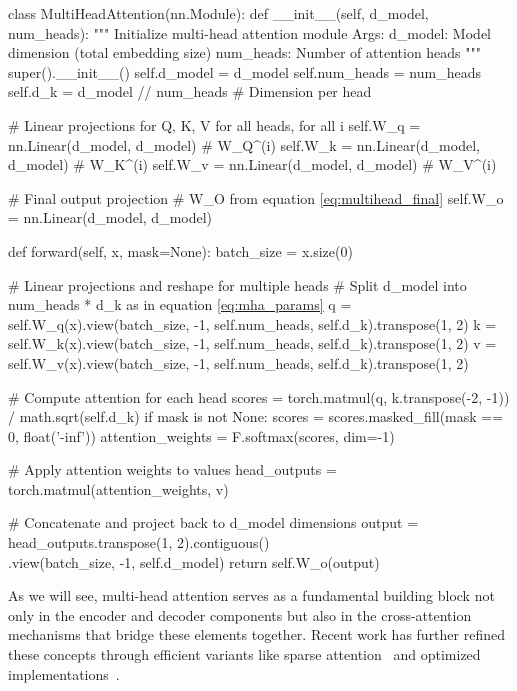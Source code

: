 \begin{pythoncode}
class MultiHeadAttention(nn.Module):
    def __init__(self, d_model, num_heads):
        """
        Initialize multi-head attention module
        Args:
            d_model: Model dimension (total embedding size)
            num_heads: Number of attention heads
        """
        super().__init__()
        self.d_model = d_model
        self.num_heads = num_heads
        self.d_k = d_model // num_heads  # Dimension per head
        
        # Linear projections for Q, K, V for all heads, for all i
        self.W_q = nn.Linear(d_model, d_model)  # W_Q^(i)
        self.W_k = nn.Linear(d_model, d_model)  # W_K^(i)
        self.W_v = nn.Linear(d_model, d_model)  # W_V^(i)
        
        # Final output projection
        # W_O from equation \ref{eq:multihead_final}
        self.W_o = nn.Linear(d_model, d_model)  
    
    def forward(self, x, mask=None):
        batch_size = x.size(0)
        
        # Linear projections and reshape for multiple heads
        # Split d_model into num_heads * d_k as in equation \ref{eq:mha_params}
        q = self.W_q(x).view(batch_size, -1, self.num_heads, self.d_k).transpose(1, 2)
        k = self.W_k(x).view(batch_size, -1, self.num_heads, self.d_k).transpose(1, 2)
        v = self.W_v(x).view(batch_size, -1, self.num_heads, self.d_k).transpose(1, 2)
        
        # Compute attention for each head 
        scores = torch.matmul(q, k.transpose(-2, -1)) / math.sqrt(self.d_k)
        if mask is not None:
            scores = scores.masked_fill(mask == 0, float('-inf'))
        attention_weights = F.softmax(scores, dim=-1)
        
        # Apply attention weights to values
        head_outputs = torch.matmul(attention_weights, v)
        
        # Concatenate and project back to d_model dimensions        
        output = head_outputs.transpose(1, 2).contiguous() \\
                 .view(batch_size, -1, self.d_model)
        return self.W_o(output)
\end{pythoncode}

\noindent
As we will see, multi-head attention serves as a fundamental building block not only in the encoder and decoder components but also in the cross-attention mechanisms that bridge these elements together. Recent work has further refined these concepts through efficient variants like sparse attention~\cite{fedus2021switch} and optimized implementations~\cite{dao2022flashattention}.

